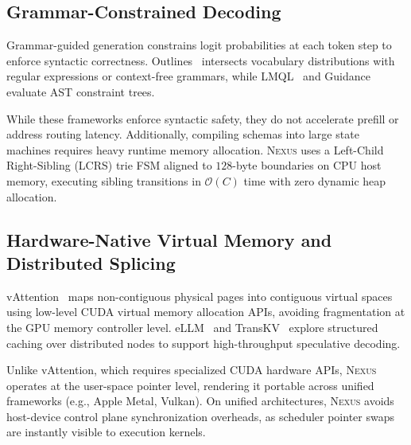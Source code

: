 \subsection{Grammar-Constrained Decoding}
Grammar-guided generation constrains logit probabilities at each token step to enforce syntactic correctness. Outlines~\cite{willard2023outlines} intersects vocabulary distributions with regular expressions or context-free grammars, while LMQL~\cite{beurer2023lmql} and Guidance~\cite{guidance2023} evaluate AST constraint trees. 

While these frameworks enforce syntactic safety, they do not accelerate prefill or address routing latency. Additionally, compiling schemas into large state machines requires heavy runtime memory allocation. \textsc{Nexus} uses a Left-Child Right-Sibling (LCRS) trie FSM aligned to $128$-byte boundaries on CPU host memory, executing sibling transitions in $\mathcal{O}(C)$ time with zero dynamic heap allocation.

\subsection{Hardware-Native Virtual Memory and Distributed Splicing}
vAttention~\cite{vattention2025} maps non-contiguous physical pages into contiguous virtual spaces using low-level CUDA virtual memory allocation APIs, avoiding fragmentation at the GPU memory controller level. eLLM~\cite{ellm} and TransKV~\cite{transkvcache} explore structured caching over distributed nodes to support high-throughput speculative decoding. 

Unlike vAttention, which requires specialized CUDA hardware APIs, \textsc{Nexus} operates at the user-space pointer level, rendering it portable across unified frameworks (e.g., Apple Metal, Vulkan). On unified architectures, \textsc{Nexus} avoids host-device control plane synchronization overheads, as scheduler pointer swaps are instantly visible to execution kernels.
